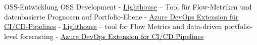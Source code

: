 \begin{cvskills}
	\cvskill
	{
			{ OSS-Entwicklung }
			{ OSS Development }
	} %
	{
		{\linebreak}
		{
			- \underline{\href{https://letpeople.work/lighthouse}{Lighthouse}} -- Tool für Flow-Metriken und datenbasierte Prognosen auf Portfolio-Ebene \linebreak
			- \underline{\href{https://marketplace.visualstudio.com/items?itemName=benjhuser.tfs-extensions-build-tasks}{Azure DevOps Extension für CI/CD-Pipelines}}
		}
		{
			- \underline{\href{https://letpeople.work/lighthouse}{Lighthouse}} -- tool for Flow Metrics and data-driven portfolio-level forecasting \linebreak
			- \underline{ \href{https://marketplace.visualstudio.com/items?itemName=benjhuser.tfs-extensions-build-tasks}{Azure DevOps Extension for CI/CD Pipelines}}
		}
	} %
\end{cvskills}
